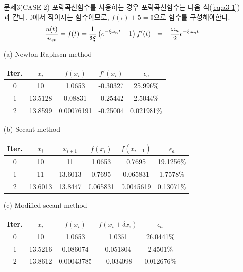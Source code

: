 \documentclass[a4,10pt]{article}
\numberwithin{algorithm}{section}
\theoremstyle{examplestyle}
\let\\\tabularnewline
\let\\\tabularnewline
\begin{document}
\clearpage
\begin{itemize}
\item[문제3(CASE-2)] 포락곡선함수를 사용하는 경우 포락곡선함수는 다음 식(\ref{eq:a3-1})과 같다. 0에서 작아지는 함수이므로, $f(t)+5=0$으로 함수를 구성해야한다.
\begin{align}
\frac{u(t)}{u_{st}}=f(t)&=\frac{1}{2\xi}\left(e^{-\xi\omega_{n}t}-1\right)\label{eq:a3-1}\\
f'(t)&=-\frac{\omega_{n}}{2}e^{-\xi\omega_{n}t}
\end{align}
\item[(a)] Newton-Raphson method
\begin{table}[!hbpt]
\centering
\begin{tabular}{c|c|c|c|c}
\hline\hline
Iter.&$x_{i}$&$f(x_{i})$&$f'(x_{i})$&$\epsilon_{a}$\\
\hline
0&10&1.0653&-0.30327&25.996\%\\
1&13.5128&0.08831&-0.25442&2.5044\%\\
2&13.8599&0.00076191&-0.25004&0.021981\%\\
\hline\hline
\end{tabular}
\end{table}

\item[(b)] Secant method
\begin{table}[!hbpt]
\centering
\begin{tabular}{c|c|c|c|c|c}
\hline\hline
Iter.&$x_{i}$&$x_{i+1}$&$f(x_{i})$&$f(x_{i+1})$&$\epsilon_{a}$\\
\hline
0&10&11&1.0653&0.7695&19.1256\%\\
1&11&13.6013&0.7695&0.065831&1.7578\%\\
2&13.6013&13.8447&0.065831&0.0045619&0.13071\%\\
\hline\hline
\end{tabular}
\end{table}

\item[(c)] Modified secant method
\begin{table}[!hbpt]
\centering
\begin{tabular}{c|c|c|c|c}
\hline\hline
Iter.&$x_{i}$&$f(x_{i})$&$f(x_{i}+\delta x_{i})$&$\epsilon_{a}$\\
\hline
0&10&1.0653&1.0351&26.0441\%\\
1&13.5216&0.086074&0.051804&2.4501\%\\
2&13.8612&0.00043785&-0.034098&0.012676\%\\
\hline\hline
\end{tabular}
\end{table}
\end{itemize}
\end{document}
